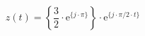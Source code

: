 \[
z(t) =  \left \{ \frac{3}{2} \cdot \textrm{e}^{\{ j \cdot \pi \}} \right \} \cdot \textrm{e}^{\{ j \cdot \pi/2 \cdot t \}}
\]
